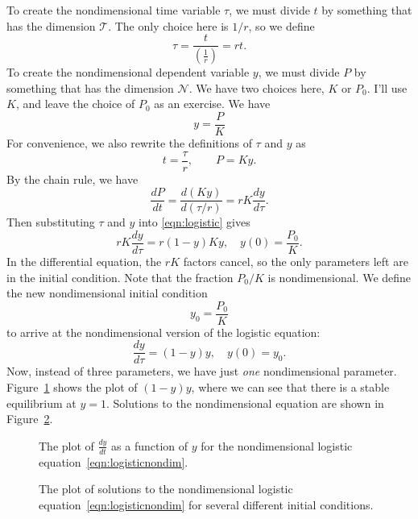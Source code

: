 \documentclass[reqno]{immbook}
\numberwithin{equation}{chapter}
\numberwithin{question}{section}
\numberwithin{theorem}{chapter}
\numberwithin{figure}{chapter}
\theoremstyle{definition}
\begin{document}
To create the nondimensional time variable $\tau$, we must
divide $t$ by something that has the dimension $\mathcal{T}$.
The only choice here is $1/r$, so
we define
\begin{equation}
  \tau = \frac{t}{\left(\frac{1}{r}\right)} = rt.
\end{equation}
To create the nondimensional dependent variable $y$, we must
divide $P$ by something that has the dimension $\mathcal{N}$.
We have two choices here, $K$ or $P_0$.
I'll use $K$, and leave the choice of $P_0$ as an exercise.
We have
\begin{equation}
   y=\frac{P}{K}
\end{equation}
For convenience, we also rewrite the definitions of
$\tau$ and $y$ as
\begin{equation}
  t = \frac{\tau}{r}, \quad\quad P = Ky.
\end{equation}
By the chain rule, we have
\begin{equation}
  \frac{dP}{dt} = \frac{d(Ky)}{d(\tau/r)}
    = rK\frac{dy}{d\tau}.
  \label{eqn:chainrule}
\end{equation}
Then substituting $\tau$ and $y$ into
\eqref{eqn:logistic}
gives
\begin{equation}
  rK\frac{dy}{d\tau} = r (1-y)Ky,  \quad y(0) = \frac{P_0}{K}.
\end{equation}
In the differential equation, the $rK$ factors cancel, so the only
parameters left are in the initial condition.
Note that the fraction $P_0/K$ is nondimensional.
We define the new nondimensional initial condition
\begin{equation}
   y_0 = \frac{P_0}{K}
\end{equation}
to arrive at the nondimensional version of the logistic equation:
\begin{equation}
  \frac{dy}{d\tau} = (1-y)y, \quad  y(0) = y_0.
\label{eqn:logisticnondim}
\end{equation}
Now, instead of three parameters, we have just \emph{one}
nondimensional parameter.
Figure~\ref{fig:logisticplot} shows the plot of $(1-y)y$, where we can see
that there is a stable equilibrium at $y=1$.
Solutions to the nondimensional equation are shown
in Figure~\ref{fig:logisticsolutionsplot}.
\begin{figure}
\centerline{%
\framebox{%
\parbox{5.5in}{%

}}}
\caption{The plot of $\frac{dy}{dt}$ as a function of $y$
for the nondimensional logistic equation~\eqref{eqn:logisticnondim}.}
\label{fig:logisticplot}
\end{figure}
\begin{figure}
\centerline{%
\framebox{%
\parbox{5.5in}{%

}}}
\caption{The plot of solutions to the nondimensional
logistic equation~\eqref{eqn:logisticnondim} for several different
initial conditions.}
\label{fig:logisticsolutionsplot}
\end{figure}
\end{document}

